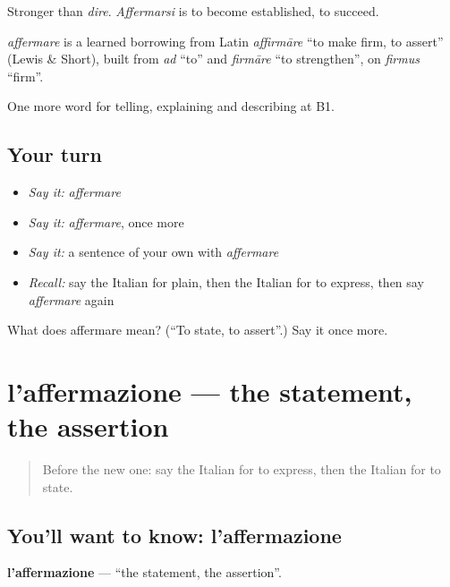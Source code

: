 Stronger than \emph{dire}. \emph{Affermarsi} is to become established, to succeed.

\begin{cousinweb}
\emph{affermare} is a learned borrowing from Latin \emph{affirmāre} \textquotedblleft{}to make firm, to assert\textquotedblright{} (Lewis \& Short), built from \emph{ad} \textquotedblleft{}to\textquotedblright{} and \emph{firmāre} \textquotedblleft{}to strengthen\textquotedblright{}, on \emph{firmus} \textquotedblleft{}firm\textquotedblright{}.
\end{cousinweb}

\begin{grammarlens}[title={What you've built}]
One more word for telling, explaining and describing at B1.
\end{grammarlens}

\subsection*{Your turn}
\begin{itemize}
\raggedright
  \item \emph{Say it:} \emph{affermare}
  \item \emph{Say it:} \emph{affermare}, once more
  \item \emph{Say it:} a sentence of your own with \emph{affermare}
  \item \emph{Recall:} say the Italian for plain, then the Italian for to express, then say \emph{affermare} again
\end{itemize}

\begin{tcolorbox}[breakable,colback=teal!4,colframe=teal!35!black,title={Before you move on}]
What does affermare mean? (\textquotedblleft{}To state, to assert\textquotedblright{}.) Say it once more.
\end{tcolorbox}
\section[l'affermazione]{l'affermazione — the statement, the assertion}

\label{lesson:IT-C345-affermazione}



\begin{quote}
Before the new one: say the Italian for to express, then the Italian for to state.
\end{quote}

\subsection*{You'll want to know: l'affermazione}
\textbf{l'affermazione} — \textquotedblleft{}the statement, the assertion\textquotedblright{}.

